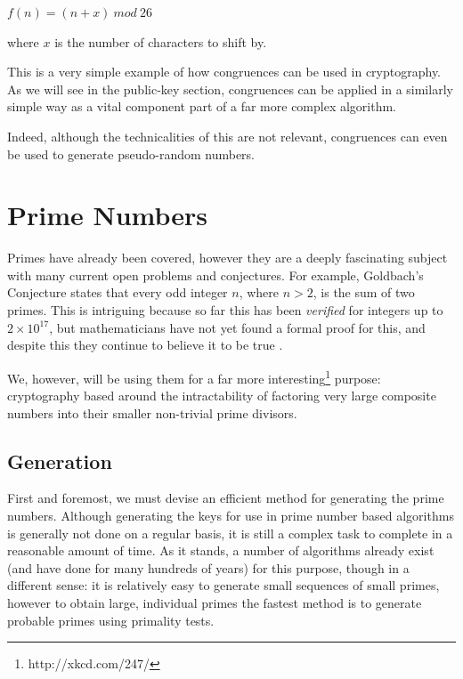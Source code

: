     \begin{center}
       $f(n) = (n + x) \ mod \ 26$
    \end{center}
    
  where $x$ is the number of characters to shift by.
  
  This is a very simple example of how congruences can be used in cryptography. As we will see in the public-key section, congruences can be applied in a similarly simple way as a vital component part of a far more complex algorithm.
  
  Indeed, although the technicalities of this are not relevant, congruences can even be used to generate pseudo-random numbers.

\section{Prime Numbers}

Primes have already been covered, however they are a deeply fascinating subject with many current open problems and conjectures. For example, Goldbach's Conjecture states that every odd integer $n$, where $n > 2$, is the sum of two primes. This is intriguing because so far this has been \emph{verified} for integers up to $2 \times 10^{17}$, but mathematicians have not yet found a formal proof for this, and despite this they continue to believe it to be true \cite{Rosen:2007aa}.

We, however, will be using them for a far more interesting\footnote{http://xkcd.com/247/} purpose: cryptography based around the intractability of factoring very large composite numbers into their smaller non-trivial prime divisors.

  \subsection{Generation}
  
  First and foremost, we must devise an efficient method for generating the prime numbers. Although generating the keys for use in prime number based algorithms is generally not done on a regular basis, it is still a complex task to complete in a reasonable amount of time. As it stands, a number of algorithms already exist (and have done for many hundreds of years) for this purpose, though in a different sense: it is relatively easy to generate small sequences of small primes, however to obtain large, individual primes the fastest method is to generate probable primes using primality tests.
  
